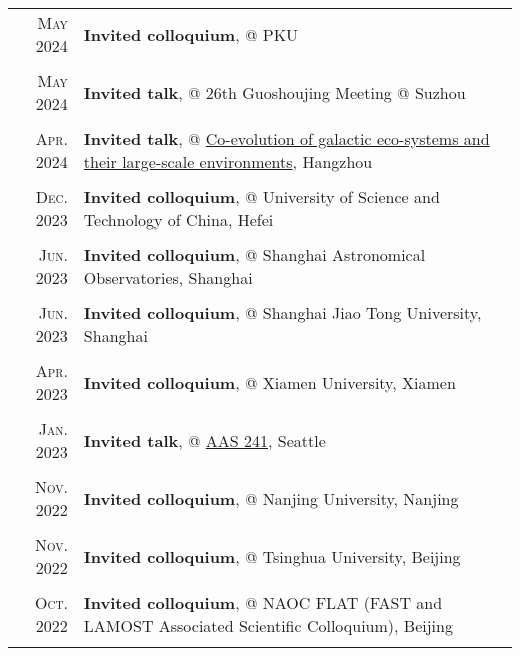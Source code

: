 \documentclass[letterpaper,10pt]{article}
\newcommand{\textwrap}{5.8in}       %
\begin{document}
\begin{longtable}{r|p{\textwrap}}
    \textsc{May 2024}   &   \textbf{Invited colloquium}, @ PKU \\
    \multicolumn{2}{c}{} \\

    \textsc{May 2024}   &   \textbf{Invited talk}, @ 26th Guoshoujing Meeting @ Suzhou \\
    \multicolumn{2}{c}{} \\

    \textsc{Apr. 2024}   &   \textbf{Invited talk}, @ \href{https://i.astro.tsinghua.edu.cn/~dxu/Hangzhou/index_meeting_HZ.html}{Co-evolution of galactic eco-systems and their large-scale environments}, Hangzhou \\
    \multicolumn{2}{c}{} \\

    \textsc{Dec. 2023}   &   \textbf{Invited colloquium}, @ University of Science and Technology of China, Hefei \\
    \multicolumn{2}{c}{} \\

    \textsc{Jun. 2023}   &   \textbf{Invited colloquium}, @ Shanghai Astronomical Observatories, Shanghai \\
    \multicolumn{2}{c}{} \\

    \textsc{Jun. 2023}   &   \textbf{Invited colloquium}, @ Shanghai Jiao Tong University, Shanghai \\
    \multicolumn{2}{c}{} \\

    \textsc{Apr. 2023}   &   \textbf{Invited colloquium}, @ Xiamen University, Xiamen \\
    \multicolumn{2}{c}{} \\

    \textsc{Jan. 2023}   &   \textbf{Invited talk}, @ \href{https://aas.org/meetings/aas241}{AAS 241}, Seattle \\
    \multicolumn{2}{c}{} \\

    \textsc{Nov. 2022}   &   \textbf{Invited colloquium}, @ Nanjing University, Nanjing    \\
    \multicolumn{2}{c}{} \\

    \textsc{Nov. 2022}   &   \textbf{Invited colloquium}, @ Tsinghua University, Beijing   \\
    \multicolumn{2}{c}{} \\

    \textsc{Oct. 2022}   &   \textbf{Invited colloquium}, @ NAOC FLAT (FAST and LAMOST Associated Scientific Colloquium), Beijing \\
    \multicolumn{2}{c}{} \\


\end{longtable}
\end{document}
